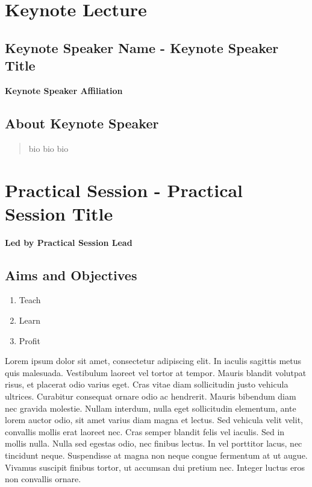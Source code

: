 \documentclass[12pt,]{book}
\providecommand{\tightlist}{%
  \setlength{\itemsep}{0pt}\setlength{\parskip}{0pt}}
\begin{document}
\section*{Keynote Lecture}\label{keynote-lecture-2}

\subsection*{Keynote Speaker Name - Keynote Speaker
Title}\label{keynote-speaker-name---keynote-speaker-title}

\textbf{Keynote Speaker Affiliation}

\subsection*{About Keynote Speaker}\label{about-keynote-speaker}

\begin{quote}
bio bio bio
\end{quote}

\section*{Practical Session - Practical Session
Title}\label{practical-session---practical-session-title}

\textbf{Led by Practical Session Lead}

\subsection*{Aims and Objectives}\label{aims-and-objectives-2}

\begin{enumerate}
\def\labelenumi{\arabic{enumi}.}
\tightlist
\item
  Teach
\item
  Learn
\item
  Profit
\end{enumerate}

Lorem ipsum dolor sit amet, consectetur adipiscing elit. In iaculis
sagittis metus quis malesuada. Vestibulum laoreet vel tortor at tempor.
Mauris blandit volutpat risus, et placerat odio varius eget. Cras vitae
diam sollicitudin justo vehicula ultrices. Curabitur consequat ornare
odio ac hendrerit. Mauris bibendum diam nec gravida molestie. Nullam
interdum, nulla eget sollicitudin elementum, ante lorem auctor odio, sit
amet varius diam magna et lectus. Sed vehicula velit velit, convallis
mollis erat laoreet nec. Cras semper blandit felis vel iaculis. Sed in
mollis nulla. Nulla sed egestas odio, nec finibus lectus. In vel
porttitor lacus, nec tincidunt neque. Suspendisse at magna non neque
congue fermentum at ut augue. Vivamus suscipit finibus tortor, ut
accumsan dui pretium nec. Integer luctus eros non convallis ornare.
\end{document}
